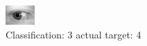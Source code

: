 \begin{figure}[h!]
\begin{center}
\includegraphics[width=0.60\columnwidth]{figures/ID747_class_3_target_4.png}
\end{center}
\caption{ Classification: 3 actual target: 4}
\label{fig:ID747_class_3_target_4}
\end{figure}
